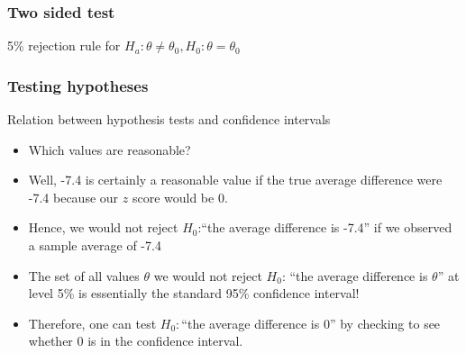 \documentclass[handout]{beamer}
\begin{document}
   \begin{frame}
   \frametitle{Two sided test}
   \begin{center}
   \end{center}
   {\color{blue} 5\% rejection rule} for $H_a: \theta \neq \theta_0, H_0: \theta = \theta_0$
   \end{frame}


   \begin{frame} \frametitle{Testing hypotheses}

   \begin{block}
   {Relation between hypothesis tests and confidence intervals}
   \begin{itemize}

   \item Which values are reasonable?


   \item Well, -7.4 is certainly a reasonable value if the true average
   difference were -7.4 because our $z$ score would be 0.

   \item Hence, we would not reject $H_0$:``the average difference is -7.4'' if we observed a sample average of -7.4

    \item The set of all values $\theta$ we would not reject $H_0$: ``the average difference is $\theta$'' at level 5\% is essentially the standard 95\% confidence interval!

    \item Therefore, one can test $H_0:$``the average difference is 0'' by
    checking to see whether 0 is in the confidence interval.

   \end{itemize}
   \end{block}
   \end{frame}

\end{document}

